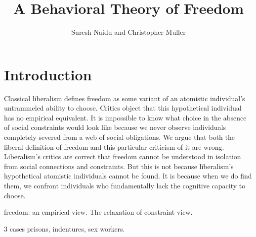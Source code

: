 \documentclass[10pt,a4paper]{article}
\title{A Behavioral Theory of Freedom}
\author{Suresh Naidu and Christopher Muller}
\begin{document}
\maketitle

\begin{abstract}
\end{abstract}

\setcounter{page}{0}
\thispagestyle{empty}

\renewcommand{\baselinestretch}{1.4}\large\normalsize

\section*{Introduction}

\noindent Classical liberalism defines freedom as some variant of an atomistic individual's untrammeled ability to choose. Critics object that this hypothetical individual has no empirical equivalent. It is impossible to know what choice in the absence of social constraints would look like because we never observe individuals completely severed from a web of social obligations. We argue that both the liberal definition of freedom and this particular criticism of it are wrong. Liberalism's critics are correct that freedom cannot be understood in isolation from social connections and constraints. But this is not because liberalism's hypothetical atomistic individuals cannot be found. It is because when we do find them, we confront individuals who fundamentally lack the cognitive capacity to choose. 

freedom: an empirical view. The relaxation of constraint view.

3 cases
prisons, indentures, sex workers.
 
\end{document}
